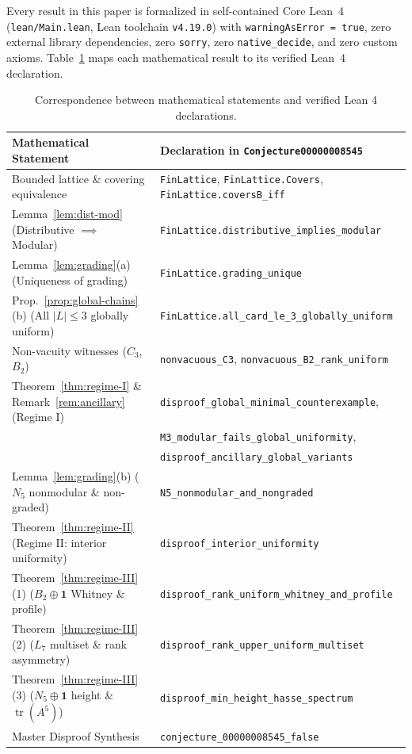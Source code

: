 \documentclass[11pt,a4paper]{article}
\theoremstyle{definition}
\theoremstyle{remark}
\newcommand{\tr}{\operatorname{tr}}
\begin{document}
Every result in this paper is formalized in self-contained Core Lean~4 (\texttt{lean/Main.lean}, Lean toolchain \texttt{v4.19.0}) with \texttt{warningAsError = true}, zero external library dependencies, zero \texttt{sorry}, zero \texttt{native\_decide}, and zero custom axioms. Table~\ref{tab:lean} maps each mathematical result to its verified Lean~4 declaration.

\begin{table}[htbp]
\centering
\caption{Correspondence between mathematical statements and verified Lean 4 declarations.}
\label{tab:lean}
\vspace{2pt}
{\footnotesize
\setlength{\tabcolsep}{5pt}
\begin{tabular}{@{}ll@{}}
\toprule
Mathematical Statement & Declaration in \texttt{Conjecture00000008545} \\
\midrule
Bounded lattice \& covering equivalence & \texttt{FinLattice}, \texttt{FinLattice.Covers}, \texttt{FinLattice.coversB\_iff} \\
Lemma~\ref{lem:dist-mod} (Distributive $\implies$ Modular) & \texttt{FinLattice.distributive\_implies\_modular} \\
Lemma~\ref{lem:grading}(a) (Uniqueness of grading) & \texttt{FinLattice.grading\_unique} \\
Prop.~\ref{prop:global-chains}(b) (All $|L|\le 3$ globally uniform) & \texttt{FinLattice.all\_card\_le\_3\_globally\_uniform} \\
Non-vacuity witnesses ($C_3$, $B_2$) & \texttt{nonvacuous\_C3}, \texttt{nonvacuous\_B2\_rank\_uniform} \\
Theorem~\ref{thm:regime-I} \& Remark~\ref{rem:ancillary} (Regime I) & \texttt{disproof\_global\_minimal\_counterexample}, \\
 & \texttt{M3\_modular\_fails\_global\_uniformity}, \\
 & \texttt{disproof\_ancillary\_global\_variants} \\
Lemma~\ref{lem:grading}(b) ($N_5$ nonmodular \& non-graded) & \texttt{N5\_nonmodular\_and\_nongraded} \\
Theorem~\ref{thm:regime-II} (Regime II: interior uniformity) & \texttt{disproof\_interior\_uniformity} \\
Theorem~\ref{thm:regime-III}(1) ($B_2 \oplus \mathbf{1}$ Whitney \& profile) & \texttt{disproof\_rank\_uniform\_whitney\_and\_profile} \\
Theorem~\ref{thm:regime-III}(2) ($L_7$ multiset \& rank asymmetry) & \texttt{disproof\_rank\_upper\_uniform\_multiset} \\
Theorem~\ref{thm:regime-III}(3) ($N_5 \oplus \mathbf{1}$ height \& $\tr(A^5)$) & \texttt{disproof\_min\_height\_hasse\_spectrum} \\
Master Disproof Synthesis & \texttt{conjecture\_00000008545\_false} \\
\bottomrule
\end{tabular}}
\end{table}
\end{document}
